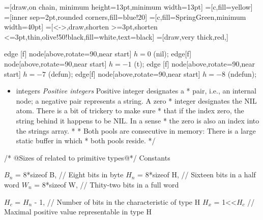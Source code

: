 \documentclass[12pt]{article}
\newenvironment{layout}{\quote
\tikzpicture[start chain=going right,x=20pt,y=14pt]
   \tikzset{pin distance=9pt}
   \tikzstyle{c}=[draw,on chain, minimum height=13pt,minimum width=13pt]
   \tikzstyle{a}=[c,fill=yellow]
   \tikzstyle{h}=[inner sep=2pt,rounded corners,fill=blue!20]
   \tikzstyle{p}=[c,fill=SpringGreen,minimum width=40pt]
   \tikzstyle{m}=[<->,draw,shorten >=3pt,shorten <=3pt,thin,olive!50!black,fill=white,text=black]
   \tikzstyle{u}=[draw,very thick,red,]
   \scriptsize%
}
{\endtikzpicture\endquote}
\begin{document}
\begin{code}
\begin{description}
\begin{layout}
     edge [f] node[above,rotate=90,near start] {\tiny $h=0$} (nil);
     edge[f] node[above,rotate=90,near start] {\tiny $h=-1$} (t);
     edge [f] node[above,rotate=90,near start] {\tiny $h=-7$} (defun);
     edge[f] node[above,rotate=90,near start] {\tiny $h=-8$} (ndefun);


\end{layout}
\end{description}
\end{code}



\begin{itemize}
    \item  integers 
    \emph{Positive integers}
Positive integer designates a * 
pair, i.e., an internal node; a negative pair represents a string. A zero
 * integer designates the NIL atom.  There is a bit of trickery to make sure
 * that if the index zero, the string behind it happens to be NIL. In a sense
 * the zero is also an index into the strings array.
 *
 * Both pools are consecutive in memory: There is a large static buffer in which 
 * both pools reside.
 */
\end{itemize}



\begin{code}[literate=
    {=}{$\equiv$ }{1}
    {*}{$\times$}{1}
    {1<<$H_c$}{$2^{H_c}$}{3}
]
/* @Sizes of related to primitive types@*/
Constants {
    $B_n$ = 8*sizeof B,    // Eight bits in byte
    $H_n$ = 8*sizeof H,    // Sixteen bits in a half word
    $W_n$ = 8*sizeof W,    // Thity-two bits in a full word
    
    $H_c$ = $H_n$ - 1,     // Number of bits in the characteristic of type H
    $H_x$ = 1<<$H_c$       // Maximal positive value representable in type H
}
\end{code}
\end{document}
